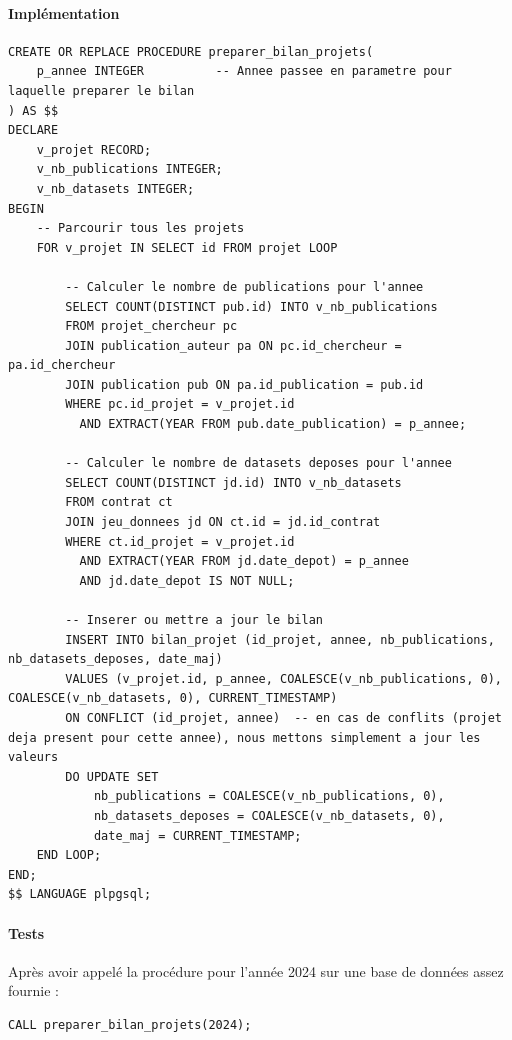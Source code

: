 \documentclass[12pt,a4paper]{article}
\begin{document}
\paragraph{Implémentation}
\begin{lstlisting}[style=sqlstyle, caption=Procédure preparation\_bilan]
CREATE OR REPLACE PROCEDURE preparer_bilan_projets(
    p_annee INTEGER          -- Annee passee en parametre pour laquelle preparer le bilan
) AS $$
DECLARE
    v_projet RECORD;
    v_nb_publications INTEGER;
    v_nb_datasets INTEGER;
BEGIN
    -- Parcourir tous les projets
    FOR v_projet IN SELECT id FROM projet LOOP
        
        -- Calculer le nombre de publications pour l'annee
        SELECT COUNT(DISTINCT pub.id) INTO v_nb_publications
        FROM projet_chercheur pc
        JOIN publication_auteur pa ON pc.id_chercheur = pa.id_chercheur
        JOIN publication pub ON pa.id_publication = pub.id
        WHERE pc.id_projet = v_projet.id
          AND EXTRACT(YEAR FROM pub.date_publication) = p_annee;
        
        -- Calculer le nombre de datasets deposes pour l'annee
        SELECT COUNT(DISTINCT jd.id) INTO v_nb_datasets
        FROM contrat ct
        JOIN jeu_donnees jd ON ct.id = jd.id_contrat
        WHERE ct.id_projet = v_projet.id
          AND EXTRACT(YEAR FROM jd.date_depot) = p_annee
          AND jd.date_depot IS NOT NULL;
        
        -- Inserer ou mettre a jour le bilan
        INSERT INTO bilan_projet (id_projet, annee, nb_publications, nb_datasets_deposes, date_maj)
        VALUES (v_projet.id, p_annee, COALESCE(v_nb_publications, 0), COALESCE(v_nb_datasets, 0), CURRENT_TIMESTAMP)
        ON CONFLICT (id_projet, annee)  -- en cas de conflits (projet deja present pour cette annee), nous mettons simplement a jour les valeurs
        DO UPDATE SET 
            nb_publications = COALESCE(v_nb_publications, 0),
            nb_datasets_deposes = COALESCE(v_nb_datasets, 0),
            date_maj = CURRENT_TIMESTAMP;
    END LOOP;
END;
$$ LANGUAGE plpgsql;
\end{lstlisting}

\paragraph{Tests}
Après avoir appelé la procédure pour l'année 2024 sur une base de données assez fournie :
\begin{lstlisting}[style=sqlstyle, caption=Test de la procédure]
CALL preparer_bilan_projets(2024);
\end{lstlisting}
\end{document}

